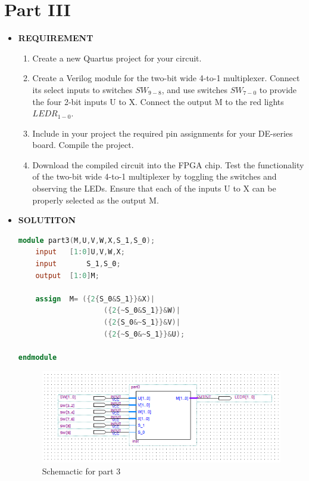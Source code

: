\documentclass[a4paper, 12pt]{report}
\begin{document}
\section{Part III }
\begin{itemize}
    \item [] \textbf{REQUIREMENT}
        \begin{enumerate}
            \item Create a new Quartus project for your circuit.
            \item Create a Verilog module for the two-bit wide 4-to-1 multiplexer. Connect its select inputs to switches $SW_{9-8}$, and use switches $SW_{7-0}$ to provide the four 2-bit inputs U to X. Connect the output M to the red lights $LEDR_{1-0}$.
            \item Include in your project the required pin assignments for your DE-series board. Compile the project.
            \item Download the compiled circuit into the FPGA chip. Test the functionality of the two-bit wide 4-to-1 multiplexer by toggling the switches and observing the LEDs. Ensure that each of the inputs U to X can be properly selected as the output M.
        \end{enumerate}
    \item [] \textbf{SOLUTITON}
        \begin{lstlisting}[language = verilog]
module part3(M,U,V,W,X,S_1,S_0);
    input 	[1:0]U,V,W,X;
    input		S_1,S_0;
    output	[1:0]M;
    
    assign 	M= ({2{S_0&S_1}}&X)|
                    ({2{~S_0&S_1}}&W)|
                    ({2{S_0&~S_1}}&V)|
                    ({2{~S_0&~S_1}}&U);
	
endmodule
        \end{lstlisting}
        \begin{figure}[h]
            \centering
            \includegraphics[width = \textwidth]{source/picture/Lab1/Lab1_3.png}
            \caption{Schemactic for part 3}
        \end{figure}
    
\end{itemize}
\clearpage
\end{document}
